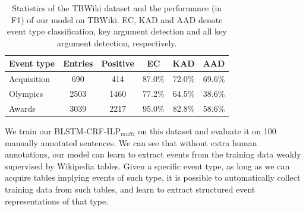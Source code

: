 \begin{table}[t]
\scriptsize
\centering
\begin{tabular}{lccccc}
    \toprule
	\textbf{Event type} & \textbf{Entries} & \textbf{Positive} & \textbf{EC} & \textbf{KAD} & \textbf{AAD} \\
    \midrule
	\rowcolor{Gray} Acquisition & 690 & 414 & 87.0\% & 72.0\% & 69.6\% \\
	Olympics & 2503 & 1460 & 77.2\% & 64.5\% & 38.6\% \\
	\rowcolor{Gray} Awards & 3039 & 2217 & 95.0\% & 82.8\% & 58.6\% \\
    \bottomrule
\end{tabular}
\vspace{-2mm}
\caption{Statistics of the TBWiki dataset and the performance (in F1) of our model on TBWiki.
EC, KAD and AAD denote event type classification, key argument detection and all key argument detection, respectively.
\label{tab:6}}
\vspace{-5mm}
\end{table}

We train our BLSTM-CRF-ILP$_{multi}$ on this dataset and evaluate it on 100 manually annotated sentences.
We can see that without extra human annotations, %
our model can learn to extract events from the training data weakly supervised by Wikipedia tables. Given a specific event type, as long as we can acquire tables implying events of such type, it is possible to automatically collect training data from such tables, and learn to extract structured event representations of that type. %
